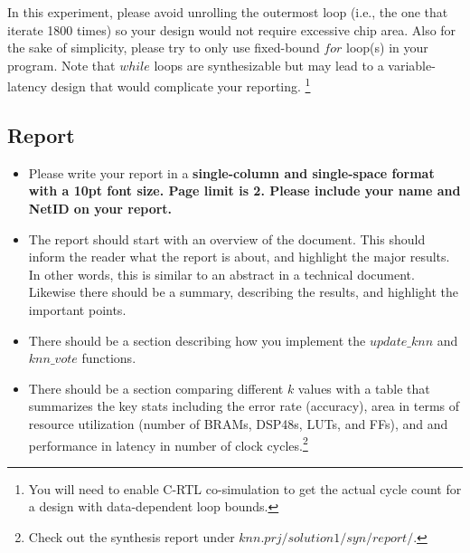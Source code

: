 \documentclass[paper=letter, fontsize=10pt]{scrartcl} %
\numberwithin{equation}{section} %
\numberwithin{figure}{section} %
\numberwithin{table}{section} %
\begin{document}
In this experiment, please avoid unrolling the outermost loop (i.e., the one that iterate 1800 times) so your design would not require excessive chip area. Also for the sake of simplicity, please try to only use fixed-bound $for$ loop(s) in your program. Note that $while$ loops are synthesizable but may lead to a variable-latency design that would  complicate your reporting. \footnote{You will need to enable C-RTL co-simulation to get the actual cycle count for a design with data-dependent loop bounds.} 

\subsection{Report}

\begin{itemize}
\item Please write your report in a \textbf{single-column and single-space format with a 10pt font size. Page limit is 2. Please include your name and NetID on your report.}

\item The report should start with an overview of the document. This should inform the reader what the report is about, and highlight the major results. In other words, this is similar to an abstract in a technical document. Likewise there should be a summary, describing the results, and highlight the important points.

\item There should be a section describing how you implement the $update\_knn$ and $knn\_vote$ functions.

\item There should be a section comparing different $k$ values with a table that summarizes the key stats including the error rate (accuracy), area in terms of resource utilization (number of BRAMs, DSP48s, LUTs, and FFs), and and performance in latency in number of clock cycles.\footnote{Check out the synthesis report under $knn.prj/solution1/syn/report/$.} 


\end{itemize}
\end{document}
